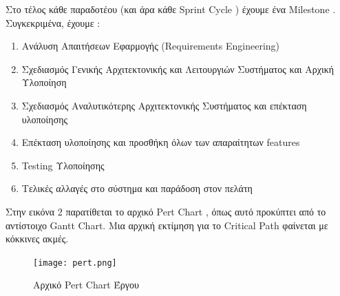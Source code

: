 \documentclass{../ol-softwaremanual}
\begin{document}
		Στο τέλος κάθε παραδοτέου (και άρα κάθε \en Sprint Cycle \gr) έχουμε ένα \en Milestone \gr. Συγκεκριμένα, έχουμε :
		
		\begin{enumerate}
			\item Ανάλυση Απαιτήσεων Εφαρμογής (\en Requirements Engineering\gr)
			\item Σχεδιασμός Γενικής Αρχιτεκτονικής και Λειτουργιών Συστήματος και Αρχική Υλοποίηση
			\item Σχεδιασμός Αναλυτικότερης Αρχιτεκτονικής Συστήματος και επέκταση υλοποίησης
			\item Επέκταση υλοποίησης και προσθήκη όλων των απαραίτητων \en features \gr
			\item \en Testing \gr Υλοποίησης
			\item Τελικές αλλαγές στο σύστημα και παράδοση στον πελάτη
		\end{enumerate}
		\newpage
		
		
		\flushleft
		Στην εικόνα 2 παρατίθεται το αρχικό \en Pert Chart \gr, όπως αυτό προκύπτει από το αντίστοιχο \en Gantt Chart\gr. Μια αρχική εκτίμηση για το \en Critical Path \gr φαίνεται με κόκκινες ακμές.
		
		\begin{figure}[htbp!]
			
			\texttt{[image: pert.png]}
						\caption{Αρχικό \en Pert Chart \gr Έργου}
		\end{figure}
	


	
\end{document}
